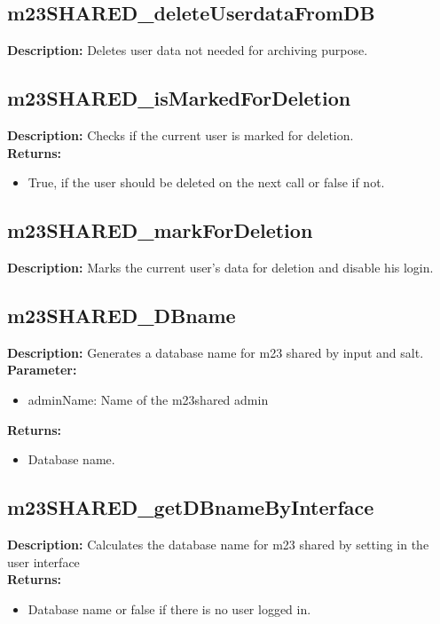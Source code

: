 \subsection{m23SHARED\_deleteUserdataFromDB}
\textbf{Description:} Deletes user data not needed for archiving purpose.\\

\subsection{m23SHARED\_isMarkedForDeletion}
\textbf{Description:} Checks if the current user is marked for deletion.\\
\textbf{Returns:}
\begin{itemize}
\item True, if the user should be deleted on the next call or false if not.
\end{itemize}

\subsection{m23SHARED\_markForDeletion}
\textbf{Description:} Marks the current user's data for deletion and disable his login.\\

\subsection{m23SHARED\_DBname}
\textbf{Description:} Generates a database name for m23 shared by input and salt.\\
\textbf{Parameter:}
\begin{itemize}
\item adminName: Name of the m23shared admin
\end{itemize}
\textbf{Returns:}
\begin{itemize}
\item Database name.
\end{itemize}

\subsection{m23SHARED\_getDBnameByInterface}
\textbf{Description:} Calculates the database name for m23 shared by setting in the user interface\\
\textbf{Returns:}
\begin{itemize}
\item Database name or false if there is no user logged in.
\end{itemize}

